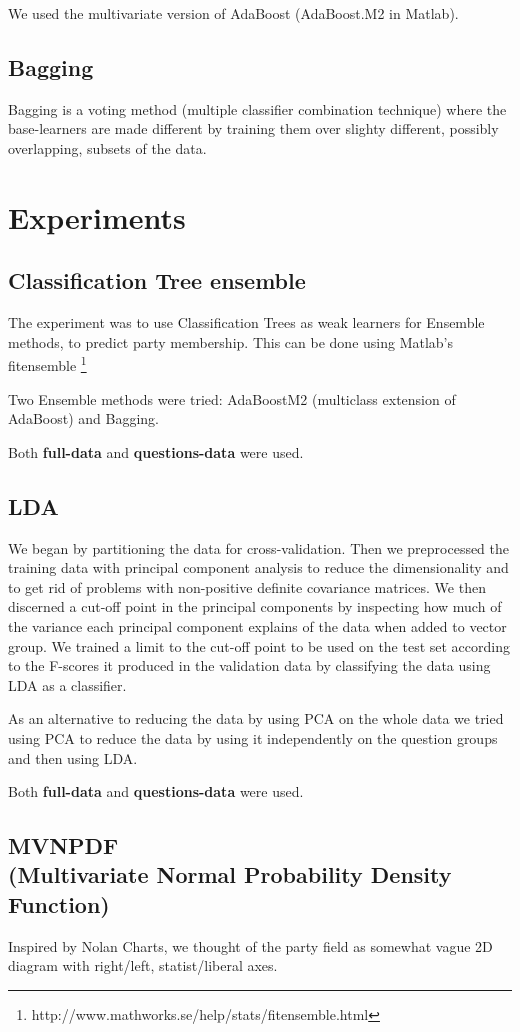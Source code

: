 \documentclass[a4paper,10pt]{article}
\begin{document}
We used the multivariate version of AdaBoost (AdaBoost.M2 in Matlab). 

\subsection{Bagging}

Bagging is a voting method (multiple classifier combination technique) where the base-learners are made different by training them over slighty different, possibly overlapping, subsets of the data.

\section{Experiments}
\subsection{Classification Tree ensemble}
The experiment was to use Classification Trees as weak learners for Ensemble methods, to predict party membership. This can be done using Matlab’s fitensemble \footnote{http://www.mathworks.se/help/stats/fitensemble.html}

Two Ensemble methods were tried: AdaBoostM2 (multiclass extension of AdaBoost) and Bagging.

Both {\bf full-data} and {\bf questions-data} were used.

\subsection{LDA}
We began by partitioning the data for cross-validation. Then we preprocessed the training data with principal component analysis to reduce the dimensionality and to get rid of problems with non-positive definite covariance matrices. We then discerned a cut-off point in the principal components by inspecting how much of the variance each principal component explains of the data when added to vector group. We trained a limit to the cut-off point to be used on the test set according to the F-scores it produced in the validation data by classifying the data using LDA as a classifier.

As an alternative to reducing the data by using PCA on the whole data we tried using PCA to reduce the data by using it independently on the question groups and then using LDA.

Both {\bf full-data} and {\bf questions-data} were used.

\subsection{MVNPDF\\ {\small (Multivariate Normal Probability Density Function)}}
Inspired by Nolan Charts, we thought of the party field as somewhat vague 2D diagram with right/left, statist/liberal axes.
\end{document}
